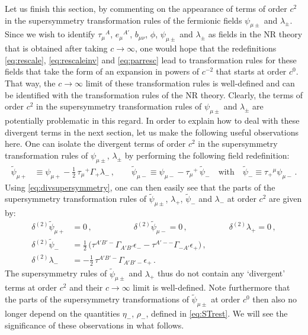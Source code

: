 \documentclass[a4paper,10pt,openany]{article}
\begin{document}
	Let us finish this section, by commenting on the appearance of terms of order $c^2$ in the supersymmetry transformation rules of the fermionic fields $\psi_{\mu\pm}$ and $\lambda_\pm$. Since we wish to identify $\tau_\mu{}^A$, $e_\mu{}^{A'}$, $b_{\mu\nu}$, $\phi$, $\psi_{\mu\pm}$ and $\lambda_{\pm}$ as fields in the NR theory that is obtained after taking $c \rightarrow \infty$, one would hope that the redefinitions \eqref{eq:rescale}, \eqref{eq:rescaleinv} and \eqref{eq:parresc} lead to transformation rules for these fields that take the form of an expansion in powers of $c^{-2}$ that starts at order $c^0$. That way, the $c\rightarrow \infty$ limit of these transformation rules is well-defined and can be identified with the transformation rules of the NR theory. Clearly, the terms of order $c^2$ in the supersymmetry transformation rules of $\psi_{\mu\pm}$ and $\lambda_\pm$ are potentially problematic in this regard. In order to explain how to deal with these divergent terms in the next section, let us make the following useful observations here. One can isolate the divergent terms of order $c^2$ in the supersymmetry transformation rules of $\psi_{\mu\pm}$, $\lambda_\pm$ by performing the following field redefinition:
	\begin{align} \label{eq:NRfermionstilde}
		\tilde\psi_{\mu+} &\equiv \psi_{\mu +} - \frac12\,\tau_\mu{}^+\Gamma_+\lambda_-\,,\qquad
		\tilde\psi_{\mu -} \equiv \psi_{\mu -} - \tau_\mu{}^+\, \tilde\psi_{-}  \quad \text{with} \quad \tilde\psi_{-} \equiv \tau_+{}^\mu\psi_{\mu -}\,.
	\end{align}
	Using \eqref{eq:divsupersymmetry}, one can then easily see that the parts of the supersymmetry transformation rules of $\tilde{\psi}_{\mu \pm}$, $\lambda_+$, $\tilde\psi_{-}$ and $\lambda_-$ at order $c^2$ are given by:
	\begin{align}\label{eq:susydivergencered}
		\delta^{(2)}\tilde\psi_{\mu+}&=0\,, \qquad \qquad \quad
		\delta^{(2)}\tilde\psi_{\mu-}=0\,, \qquad \qquad \quad \delta^{(2)}\lambda_{+}=0 \,, \nonumber \\
		\delta^{(2)}\tilde\psi_{-}&=\frac12\,\big(\tau^{A'B'-}\Gamma_{A'B'}\epsilon_- - \tau^{A'--}\Gamma_{-A'}\epsilon_+ \big)\,, \nonumber \\
		\delta^{(2)}\lambda_- &= -\frac12\,\tau^{A'B'-}\Gamma_{A'B'-}\epsilon_+\,.
	\end{align}
	The supersymmetry rules of $\tilde{\psi}_{\mu\pm}$ and $\lambda_+$ thus do not contain any `divergent' terms at order $c^2$ and their $c \rightarrow \infty$ limit is well-defined. Note furthermore that the parts of the supersymmetry transformations of $\tilde{\psi}_{\mu\pm}$ at order $c^0$ then also no longer depend on the quantities $\eta_-$, $\rho_-$, defined in \eqref{eq:STrest}. We will see the significance of these observations in what follows.
	
\end{document}
